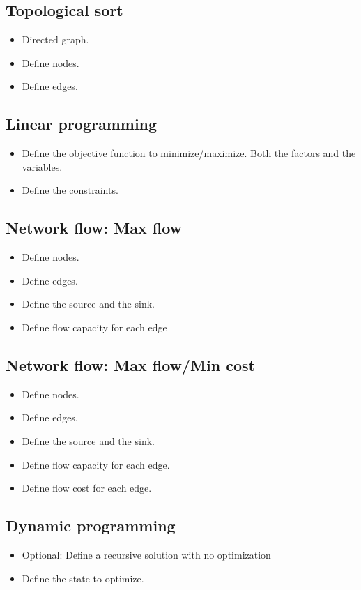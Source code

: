 \documentclass[guide.tex]{subfiles}
\begin{document}
\subsection{Topological sort}
\begin{itemize}
  \item Directed graph.
  \item Define nodes.
  \item Define edges.
\end{itemize}

\subsection{Linear programming}
\begin{itemize}
  \item Define the objective function to minimize/maximize. Both the factors and the variables.
  \item Define the constraints.
\end{itemize}

\subsection{Network flow: Max flow}
\begin{itemize}
  \item Define nodes.
  \item Define edges.
  \item Define the source and the sink.
  \item Define flow capacity for each edge
\end{itemize}

\subsection{Network flow: Max flow/Min cost}
\begin{itemize}
  \item Define nodes.
  \item Define edges.
  \item Define the source and the sink.
  \item Define flow capacity for each edge.
  \item Define flow cost for each edge.
\end{itemize}

\subsection{Dynamic programming}
\begin{itemize}
  \item Optional: Define a recursive solution with no optimization
  \item Define the state to optimize.
\end{itemize}
\end{document}
